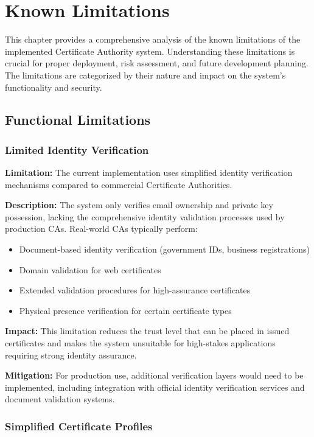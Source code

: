 \chapter{Known Limitations}

This chapter provides a comprehensive analysis of the known limitations of the implemented Certificate Authority system. Understanding these limitations is crucial for proper deployment, risk assessment, and future development planning. The limitations are categorized by their nature and impact on the system's functionality and security.

\section{Functional Limitations}

\subsection{Limited Identity Verification}

\textbf{Limitation:} The current implementation uses simplified identity verification mechanisms compared to commercial Certificate Authorities.

\textbf{Description:} The system only verifies email ownership and private key possession, lacking the comprehensive identity validation processes used by production CAs. Real-world CAs typically perform:
\begin{itemize}
    \item Document-based identity verification (government IDs, business registrations)
    \item Domain validation for web certificates
    \item Extended validation procedures for high-assurance certificates
    \item Physical presence verification for certain certificate types
\end{itemize}

\textbf{Impact:} This limitation reduces the trust level that can be placed in issued certificates and makes the system unsuitable for high-stakes applications requiring strong identity assurance.

\textbf{Mitigation:} For production use, additional verification layers would need to be implemented, including integration with official identity verification services and document validation systems.

\subsection{Simplified Certificate Profiles}

